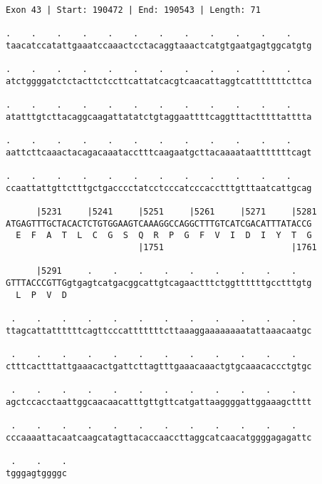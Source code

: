 \documentclass{article}
\begin{document}
\newpage
\begin{Verbatim}[fontfamily=courier]
Exon 43 | Start: 190472 | End: 190543 | Length: 71

.    .    .    .    .    .    .    .    .    .    .    .    
taacatccatattgaaatccaaactcctacaggtaaactcatgtgaatgagtggcatgtg

.    .    .    .    .    .    .    .    .    .    .    .    
atctggggatctctacttctccttcattatcacgtcaacattaggtcatttttttcttca

.    .    .    .    .    .    .    .    .    .    .    .    
atatttgtcttacaggcaagattatatctgtaggaattttcaggtttactttttatttta

.    .    .    .    .    .    .    .    .    .    .    .    
aattcttcaaactacagacaaatacctttcaagaatgcttacaaaataatttttttcagt

.    .    .    .    .    .    .    .    .    .    .    .    
ccaattattgttctttgctgacccctatcctcccatcccacctttgtttaatcattgcag

      |5231     |5241     |5251     |5261     |5271     |5281
ATGAGTTTGCTACACTCTGTGGAAGTCAAAGGCCAGGCTTTGTCATCGACATTTATACCG
  E  F  A  T  L  C  G  S  Q  R  P  G  F  V  I  D  I  Y  T  G
                          |1751                         |1761

      |5291     .    .    .    .    .    .    .    .    .   
GTTTACCCGTTGgtgagtcatgacggcattgtcagaactttctggttttttgcctttgtg
  L  P  V  D                                                

 .    .    .    .    .    .    .    .    .    .    .    .   
ttagcattattttttcagttcccatttttttcttaaaggaaaaaaaatattaaacaatgc

 .    .    .    .    .    .    .    .    .    .    .    .   
ctttcactttattgaaacactgattcttagtttgaaacaaactgtgcaaacaccctgtgc

 .    .    .    .    .    .    .    .    .    .    .    .   
agctccacctaattggcaacaacatttgttgttcatgattaaggggattggaaagctttt

 .    .    .    .    .    .    .    .    .    .    .    .   
cccaaaattacaatcaagcatagttacaccaaccttaggcatcaacatggggagagattc

 .    .    .
tgggagtggggc
\end{Verbatim}
\newpage
\end{document}
